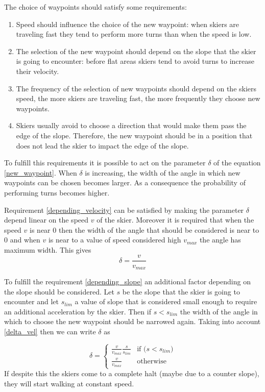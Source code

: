 \documentclass[12pt,a4paper,twoside]{book}
\begin{document}
The choice of waypoints should satisfy some requirements:\begin{enumerate}
\item \label{depending_velocity} Speed should influence the choice of the new waypoint: when skiers are traveling fast they tend to perform more turns than when the speed is low.
\item \label{depending_slope} The selection of the new waypoint should depend on the slope that the skier is going to encounter: before flat areas skiers tend to avoid turns to increase their velocity.
\item \label{frequency} The frequency of the selection of new waypoints should depend on the skiers speed, the more skiers are traveling fast, the more frequently they choose new waypoints.
\item \label{avoid_impact} Skiers usually avoid to choose a direction that would make them pass the edge of the slope. Therefore, the new waypoint should be in a position that does not lead the skier to impact the edge of the slope.
\end{enumerate}

To fulfill this requirements it is possible to act on the parameter $\delta$ of the equation \ref{new_waypoint}. When $\delta$ is increasing, the width of the angle in which new waypoints can be chosen becomes larger. As a consequence the probability of performing turns becomes higher.

Requirement \ref{depending_velocity} can be satisfied by making the parameter $\delta$ depend linear on the speed $v$ of the skier. Moreover it is required that when the speed $v$ is near $0$ then the width of the angle that should be considered is near to $0$ and when $v$ is near to a value of speed considered high $v_{max}$ the angle has maximum width. This gives
\begin{equation}\label{delta_vel}
\delta= \frac{v}{v_{max}}
\end{equation}

To fulfill the requirement \ref{depending_slope} an additional factor depending on the slope should be considered. Let $s$ be the slope that the skier is going to encounter and let $s_{lim}$ a value of slope that is considered small enough to require an additional acceleration by the skier. Then if $s<s_{lim}$ the width of the angle in which to choose the new waypoint should be narrowed again. Taking into account \ref{delta_vel} then we can write $\delta$ as

\begin{equation}
\delta=\begin{cases}
   \frac{v}{v_{max}}\frac{s}{s_{lim}} & \text{if ($s < s_{lim}$)} \\
   \frac{v}{v_{max}} & \text{otherwise}
\end{cases}
\end{equation}
If despite this the skiers come to a complete halt (maybe due to a counter slope), they will start walking at constant speed.
\end{document}
